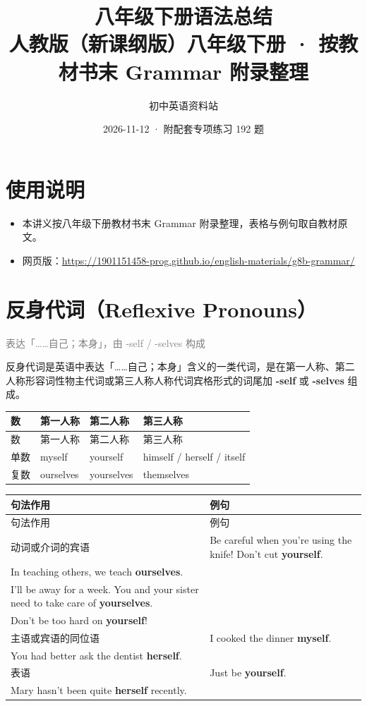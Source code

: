 \documentclass[11pt,a4paper]{ctexart}
\title{\textbf{八年级下册语法总结}\\[4pt]
\large 人教版（新课纲版）八年级下册 · 按教材书末 Grammar 附录整理}
\author{初中英语资料站}
\date{2026-11-12 · 附配套专项练习 192 题}
\begin{document}
\maketitle
\section*{使用说明}
\begin{itemize}[leftmargin=1.4em]
\item 本讲义按八年级下册教材书末 Grammar 附录整理，表格与例句取自教材原文。
\item 网页版：\url{https://1901151458-prog.github.io/english-materials/g8b-grammar/}
\end{itemize}

\section{反身代词（Reflexive Pronouns）}
\noindent\textcolor{gray}{表达「……自己；本身」，由 -self / -selves 构成}\par\smallskip
反身代词是英语中表达「……自己；本身」含义的一类代词，是在第一人称、第二人称形容词性物主代词或第三人称人称代词宾格形式的词尾加 \textbf{-self} 或 \textbf{-selves} 组成。

{\footnotesize
\begin{longtable}{p{3.35cm}p{3.35cm}p{3.35cm}p{3.35cm}}
\hline
数 & 第一人称 & 第二人称 & 第三人称 \\
\hline
\endfirsthead
\hline
数 & 第一人称 & 第二人称 & 第三人称 \\
\hline
\endhead
\hline
\endfoot
单数 & myself & yourself & himself / herself / itself \\
复数 & ourselves & yourselves & themselves \\
\end{longtable}
}

{\footnotesize
\begin{longtable}{p{6.70cm}p{6.70cm}}
\hline
句法作用 & 例句 \\
\hline
\endfirsthead
\hline
句法作用 & 例句 \\
\hline
\endhead
\hline
\endfoot
动词或介词的宾语 & Be careful when you’re using the knife! Don’t cut \textbf{yourself}.\\ In teaching others, we teach \textbf{ourselves}.\\ I’ll be away for a week. You and your sister need to take care of \textbf{yourselves}.\\ Don’t be too hard on \textbf{yourself}! \\
主语或宾语的同位语 & I cooked the dinner \textbf{myself}.\\ You had better ask the dentist \textbf{herself}. \\
表语 & Just be \textbf{yourself}.\\ Mary hasn’t been quite \textbf{herself} recently. \\
\end{longtable}
}
\end{document}
